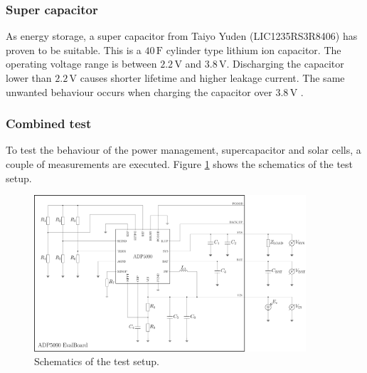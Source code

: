 \subsubsection{Super capacitor}
As energy storage, a super capacitor from Taiyo Yuden (LIC1235RS3R8406) has proven to be suitable.
This is a $40\,\text{F}$ cylinder type lithium ion capacitor.
The operating voltage range is between $2.2\,\text{V}$ and $3.8\,\text{V}$.
Discharging the capacitor lower than $2.2\,\text{V}$ causes shorter lifetime and higher leakage current.
The same unwanted behaviour occurs when charging the capacitor over $3.8\,\text{V}$ \cites{yuden}.

\subsubsection{Combined test}
To test the behaviour of the power management, supercapacitor and solar cells, a couple of measurements are executed.
Figure \ref{development:test} shows the schematics of the test setup.

\begin{figure}[ht]
	\centering
	\includegraphics[width=0.9\textwidth]{4-development/hardware/graphics/testaufbau.pdf}
	\caption{Schematics of the test setup.\label{development:test}}
\end{figure}

